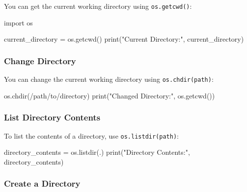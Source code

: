 \documentclass[
  letterpaper,
  DIV=11,
  numbers=noendperiod]{scrreprt}
\newenvironment{Shaded}{\begin{snugshade}}{\end{snugshade}}
\newcommand{\BuiltInTok}[1]{\textcolor[rgb]{0.00,0.23,0.31}{#1}}
\newcommand{\ImportTok}[1]{\textcolor[rgb]{0.00,0.46,0.62}{#1}}
\newcommand{\NormalTok}[1]{\textcolor[rgb]{0.00,0.23,0.31}{#1}}
\newcommand{\OperatorTok}[1]{\textcolor[rgb]{0.37,0.37,0.37}{#1}}
\newcommand{\StringTok}[1]{\textcolor[rgb]{0.13,0.47,0.30}{#1}}
\begin{document}
You can get the current working directory using \texttt{os.getcwd()}:

\begin{Shaded}
\begin{Highlighting}[]
\ImportTok{import}\NormalTok{ os}

\NormalTok{current\_directory }\OperatorTok{=}\NormalTok{ os.getcwd()}
\BuiltInTok{print}\NormalTok{(}\StringTok{"Current Directory:"}\NormalTok{, current\_directory)}
\end{Highlighting}
\end{Shaded}

\subsubsection{Change Directory}\label{change-directory}

You can change the current working directory using
\texttt{os.chdir(path)}:

\begin{Shaded}
\begin{Highlighting}[]
\NormalTok{os.chdir(}\StringTok{\textquotesingle{}/path/to/directory\textquotesingle{}}\NormalTok{)}
\BuiltInTok{print}\NormalTok{(}\StringTok{"Changed Directory:"}\NormalTok{, os.getcwd())}
\end{Highlighting}
\end{Shaded}

\subsubsection{List Directory Contents}\label{list-directory-contents}

To list the contents of a directory, use \texttt{os.listdir(path)}:

\begin{Shaded}
\begin{Highlighting}[]
\NormalTok{directory\_contents }\OperatorTok{=}\NormalTok{ os.listdir(}\StringTok{\textquotesingle{}.\textquotesingle{}}\NormalTok{)}
\BuiltInTok{print}\NormalTok{(}\StringTok{"Directory Contents:"}\NormalTok{, directory\_contents)}
\end{Highlighting}
\end{Shaded}

\subsubsection{Create a Directory}\label{create-a-directory}
\end{document}
